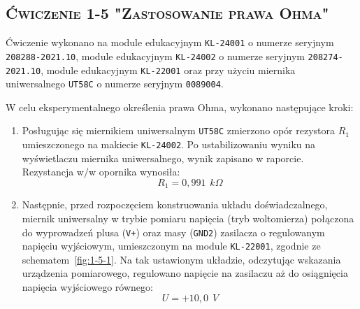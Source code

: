 \documentclass[,a4paper,12pt]{article}
\begin{document}
\subsection{\textsc{Ćwiczenie 1-5 "Zastosowanie prawa Ohma"}}
Ćwiczenie wykonano na module edukacyjnym \texttt{KL-24001} o numerze seryjnym \texttt{208288-2021.10}, module edukacyjnym \texttt{KL-24002} o numerze seryjnym \texttt{208274-2021.10}, module edukacyjnym \texttt{KL-22001} oraz przy użyciu miernika uniwersalnego \texttt{UT58C} o numerze seryjnym \texttt{0089004}.\\ \par
W celu eksperymentalnego określenia prawa Ohma, wykonano następujące kroki:
\begin{enumerate}
    \item Posługując się miernikiem uniwersalnym \texttt{UT58C} zmierzono opór rezystora $R_1$ umieszczonego na makiecie \texttt{KL-24002}. Po ustabilizowaniu wyniku na wyświetlaczu miernika uniwersalnego, wynik zapisano w raporcie. Rezystancja w/w opornika wynosiła:
    \begin{equation}
        R_1=0,991\hspace{5pt}k\Omega
        \label{er1}
    \end{equation}
    \item Następnie, przed rozpoczęciem konstruowania układu doświadczalnego, miernik uniwersalny w trybie pomiaru napięcia (tryb woltomierza) połączona do wyprowadzeń plusa (\texttt{V+}) oraz masy (\texttt{GND2}) zasilacza o regulowanym napięciu wyjściowym, umieszczonym na module \texttt{KL-22001}, zgodnie ze schematem~\ref{fig:1-5-1}. Na tak ustawionym układzie, odczytując wskazania urządzenia pomiarowego, regulowano napięcie na zasilaczu aż do osiągnięcia napięcia wyjściowego równego: \begin{equation}
        U=+10,0 \hspace{5pt}V
        \label{fał1}
    \end{equation}
    

\end{enumerate}
\end{document}
